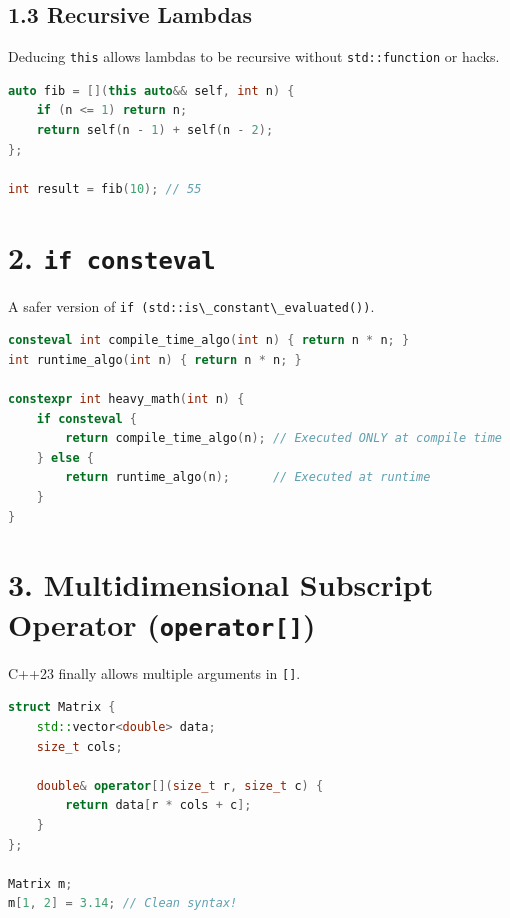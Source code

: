 \hypertarget{recursive-lambdas}{%
\subsection{1.3 Recursive Lambdas}\label{recursive-lambdas}}

Deducing \passthrough{\lstinline!this!} allows lambdas to be recursive
without \passthrough{\lstinline!std::function!} or hacks.

\begin{lstlisting}[language={C++}]
auto fib = [](this auto&& self, int n) {
    if (n <= 1) return n;
    return self(n - 1) + self(n - 2);
};

int result = fib(10); // 55
\end{lstlisting}

\hypertarget{if-consteval}{%
\section{\texorpdfstring{2.
\texttt{if\ consteval}}{2. if consteval}}\label{if-consteval}}

A safer version of
\passthrough{\lstinline!if (std::is\_constant\_evaluated())!}.

\begin{lstlisting}[language={C++}]
consteval int compile_time_algo(int n) { return n * n; }
int runtime_algo(int n) { return n * n; }

constexpr int heavy_math(int n) {
    if consteval {
        return compile_time_algo(n); // Executed ONLY at compile time
    } else {
        return runtime_algo(n);      // Executed at runtime
    }
}
\end{lstlisting}

\hypertarget{multidimensional-subscript-operator-operator}{%
\section{\texorpdfstring{3. Multidimensional Subscript Operator
(\texttt{operator{[}{]}})}{3. Multidimensional Subscript Operator (operator{[}{]})}}\label{multidimensional-subscript-operator-operator}}

C++23 finally allows multiple arguments in \passthrough{\lstinline![]!}.

\begin{lstlisting}[language={C++}]
struct Matrix {
    std::vector<double> data;
    size_t cols;

    double& operator[](size_t r, size_t c) {
        return data[r * cols + c];
    }
};

Matrix m;
m[1, 2] = 3.14; // Clean syntax!
\end{lstlisting}

